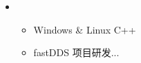 \resheading{{\color{white}{ 工作经历}} }
  \begin{itemize}[leftmargin=*]

      \item
      {\small
      \begin{itemize}
        \item Windows \& Linux C++
        \item fastDDS 项目研发...
      \end{itemize}
      }


    \end{itemize}


